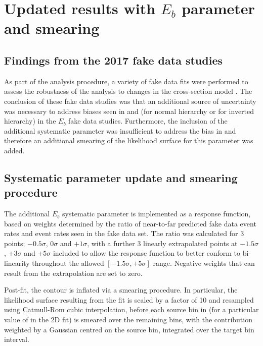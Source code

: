 \clearpage

\section {Updated results with $E_b$ parameter and \dmsq smearing}
\label{sec:results2017b}

\subsection{Findings from the 2017 fake data studies}

As part of the analysis procedure, a variety of fake data fits were performed to assess the robustness of the analysis to changes in the cross-section model \cite{FakeData:2017}. The conclusion of these fake data studies was that an additional source of uncertainty was necessary to address biases seen in \ssqthtwothree and \dmsq (\dmsqtwothree for normal hierarchy or \dmsqonethree for inverted hierarchy) in the $E_b$ fake data studies. Furthermore, the inclusion of the additional systematic parameter was insufficient to address the bias in \dmsq and therefore an additional smearing of the likelihood surface for this parameter was added.

\subsection{Systematic parameter update and smearing procedure}

The additional $E_b$ systematic parameter is implemented as a response function, based on weights determined by the ratio of near-to-far predicted fake data event rates and event rates seen in the fake data set. The ratio was calculated for 3 points; $-0.5\sigma$, $0\sigma$ and $+1\sigma$, with  a further 3 linearly extrapolated points at $-1.5\sigma$, $+3\sigma$ and $+5\sigma$ included to allow the response function to better conform to bi-linearity throughout the allowed $[-1.5\sigma, +5\sigma]$ range. \color{blue}Negative weights that can result from the extrapolation are set to zero.\color{black}

Post-fit, the \dmsq contour is inflated via a smearing procedure. In particular, the likelihood surface resulting from the fit is scaled by a factor of 10 and resampled using Catmull-Rom cubic interpolation, before each source bin in \dmsq (for a particular value of \ssqthtwothree in the 2D fit) is smeared over the remaining \dmsq bins, with the contribution weighted by a Gaussian centred on the source bin, integrated over the target bin interval.

